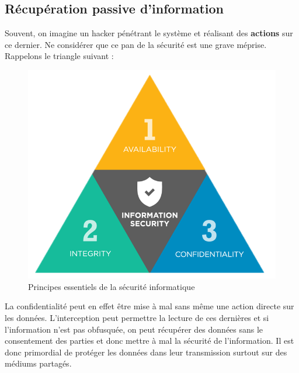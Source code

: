\documentclass[12pt]{article}
\begin{document}

\subsection{Récupération passive d'information}

Souvent, on imagine un hacker pénétrant le système et réalisant des \textbf{actions} sur ce dernier. Ne considérer que ce pan de la sécurité est une grave méprise. Rappelons le triangle suivant : 

\begin{figure}[h]
\begin{center}
\includegraphics[width=.6\textwidth]{CAI.png}
\caption{Principes essentiels de la sécurité informatique}
\end{center}
\end{figure}

La confidentialité peut en effet être mise à mal sans même une action directe sur les données. L'interception peut permettre la lecture de ces dernières et si l'information n'est pas obfusquée, on peut récupérer des données sans le consentement des parties et donc mettre à mal la sécurité de l'information. Il est donc primordial de protéger les données dans leur transmission surtout sur des médiums partagés.
\medskip
\end{document}
